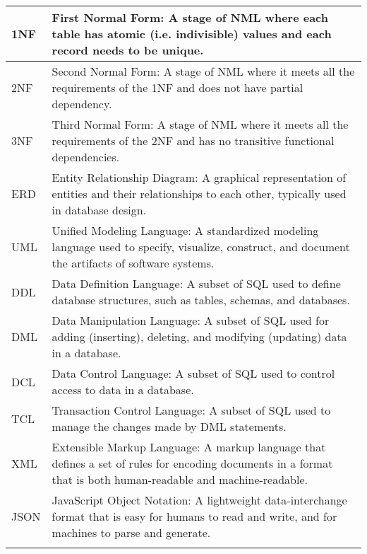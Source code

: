 \begin{longtable}{l p{13.5cm}}
        1NF          & First Normal Form: A stage of NML where each table has atomic (i.e. indivisible) values and each record needs to be unique. \\ \hline
        2NF          & Second Normal Form: A stage of NML where it meets all the requirements of the 1NF and does not have partial dependency. \\ \hline
        3NF          & Third Normal Form: A stage of NML where it meets all the requirements of the 2NF and has no transitive functional dependencies. \\ \hline
        ERD          & Entity Relationship Diagram: A graphical representation of entities and their relationships to each other, typically used in database design. \\ \hline
        UML          & Unified Modeling Language: A standardized modeling language used to specify, visualize, construct, and document the artifacts of software systems. \\ \hline
        DDL          & Data Definition Language: A subset of SQL used to define database structures, such as tables, schemas, and databases. \\ \hline
        DML          & Data Manipulation Language: A subset of SQL used for adding (inserting), deleting, and modifying (updating) data in a database. \\ \hline
        DCL          & Data Control Language: A subset of SQL used to control access to data in a database. \\ \hline
        TCL          & Transaction Control Language: A subset of SQL used to manage the changes made by DML statements. \\ \hline
        XML          & Extensible Markup Language: A markup language that defines a set of rules for encoding documents in a format that is both human-readable and machine-readable. \\ \hline
        JSON         & JavaScript Object Notation: A lightweight data-interchange format that is easy for humans to read and write, and for machines to parse and generate. \\ \hline
    \renewcommand{\arraystretch}{1}
\end{longtable}